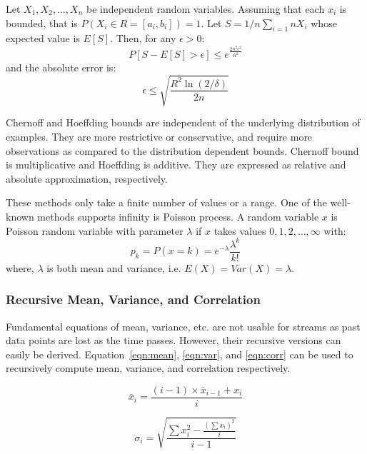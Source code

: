 \begin{theorem}
\label{thm:hoeffding}
    Let $X_1,X_2,\dots, X_n$ be independent random variables. Assuming that each $x_i$ is bounded, that is $P(X_i \in R = [a_i, b_i]) = 1$. Let $S = 1/n \sum_{i=1}{n} X_i$ whose expected value is $E[S]$. Then, for any $\epsilon > 0$:
    \[
        P[S - E[S] > \epsilon] \le e^{ \frac{2 n^2 \epsilon^2}{R^2} }
    \]
    and the absolute error is:
    \[
        \epsilon \le \sqrt{\frac{R^2 \ln(2/\delta)}{2n}}
    \]
\end{theorem}

Chernoff and Hoeffding bounds are independent of the underlying distribution of examples. They are more restrictive or conservative, and require more observations as compared to the distribution dependent bounds. Chernoff bound is multiplicative and Hoeffding is additive. They are expressed as relative and absolute approximation, respectively.

These methods only take a finite number of values or a range. One of the well-known methods supports infinity is Poisson process. A random variable $x$ is Poisson random variable with parameter $\lambda$ if $x$ takes values $0,1,2, \dots, \infty$ with:
    \begin{equation}
    \label{eqn:poisson}
        p_k = P(x=k) = e^{-\lambda} \frac{\lambda^k}{k!}
    \end{equation}
where, $\lambda$ is both mean and variance, i.e. $E(X) = Var(X) = \lambda$.
    
\subsubsection{Recursive Mean, Variance, and Correlation}
Fundamental equations of mean, variance, etc. are not usable for streams as past data points are lost as the time passes. However, their recursive versions can easily be derived. Equation~\ref{eqn:mean}, \ref{eqn:var}, and \ref{eqn:corr} can be used to recursively compute mean, variance, and correlation respectively.

\begin{equation}
\label{eqn:mean}
    \bar{x}_i = \frac{(i-1) \times \bar{x}_{i-1} + x_i}{i}
\end{equation}

\begin{equation}
\label{eqn:var}
    \sigma_i = \sqrt{ \frac{\sum x_i^2 - \frac{ (\sum x_i )^2}{i} }{i-1} }
\end{equation}

